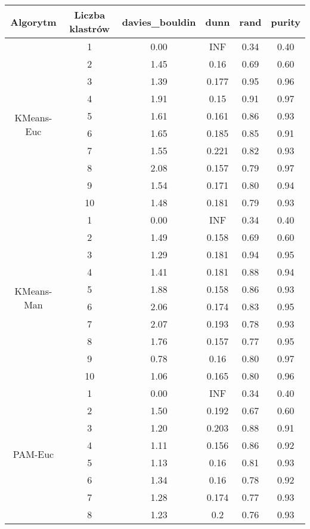 \begin{table}[H]
\centering
\begin{tabular}{cc|cccc}
  \hline
Algorytm & Liczba klastrów & davies\_bouldin & dunn & rand & purity \\ 
  \hline
  \multirow{10}{*}{KMeans-Euc} & 1 & 0.00 & INF & 0.34 & 0.40 \\ 
  & 2 & 1.45 & 0.16 & 0.69 & 0.60 \\ 
  & 3 & 1.39 & 0.177 & 0.95 & 0.96 \\ 
  & 4 & 1.91 & 0.15 & 0.91 & 0.97 \\ 
  & 5 & 1.61 & 0.161 & 0.86 & 0.93 \\ 
  & 6 & 1.65 & 0.185 & 0.85 & 0.91 \\ 
  & 7 & 1.55 & 0.221 & 0.82 & 0.93 \\ 
  & 8 & 2.08 & 0.157 & 0.79 & 0.97 \\ 
  & 9 & 1.54 & 0.171 & 0.80 & 0.94 \\ 
  & 10 & 1.48 & 0.181 & 0.79 & 0.93 \\ \hline \hline 
  \multirow{10}{*}{KMeans-Man} & 1 & 0.00 & INF & 0.34 & 0.40 \\ 
  & 2 & 1.49 & 0.158 & 0.69 & 0.60 \\ 
  & 3 & 1.29 & 0.181 & 0.94 & 0.95 \\ 
  & 4 & 1.41 & 0.181 & 0.88 & 0.94 \\ 
  & 5 & 1.88 & 0.158 & 0.86 & 0.93 \\ 
  & 6 & 2.06 & 0.174 & 0.83 & 0.95 \\ 
  & 7 & 2.07 & 0.193 & 0.78 & 0.93 \\ 
  & 8 & 1.76 & 0.157 & 0.77 & 0.95 \\ 
  & 9 & 0.78 & 0.16 & 0.80 & 0.97 \\ 
  & 10 & 1.06 & 0.165 & 0.80 & 0.96 \\ \hline \hline 
  \multirow{10}{*}{PAM-Euc} & 1 & 0.00 & INF & 0.34 & 0.40 \\ 
  & 2 & 1.50 & 0.192 & 0.67 & 0.60 \\ 
  & 3 & 1.20 & 0.203 & 0.88 & 0.91 \\ 
  & 4 & 1.11 & 0.156 & 0.86 & 0.92 \\ 
  & 5 & 1.13 & 0.16 & 0.81 & 0.93 \\ 
  & 6 & 1.34 & 0.16 & 0.78 & 0.92 \\ 
  & 7 & 1.28 & 0.174 & 0.77 & 0.93 \\ 
  & 8 & 1.23 & 0.2 & 0.76 & 0.93 \\ 

\end{tabular}
\end{table}
